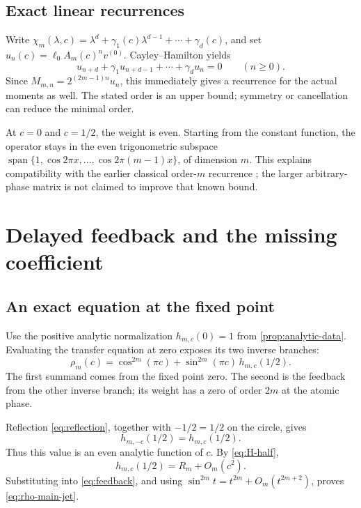 \documentclass[11pt,a4paper]{article}
\numberwithin{equation}{section}
\theoremstyle{definition}
\theoremstyle{remark}
\begin{document}
\subsection{Exact linear recurrences}
Write
$\chi_m(\lambda,c)=\lambda^d+\gamma_1(c)\lambda^{d-1}
+\cdots+\gamma_d(c)$, and set
$u_n(c)=\ell_0A_m(c)^nv^{(0)}$.
Cayley--Hamilton yields
\begin{equation}
 u_{n+d}+\gamma_1u_{n+d-1}+\cdots+\gamma_du_n=0
 \qquad(n\geq0).
 \label{eq:recurrence}
\end{equation}
Since $M_{m,n}=2^{(2m-1)n}u_n$, this immediately gives a recurrence
for the actual moments as well. The stated order is an upper bound;
symmetry or cancellation can reduce the minimal order.

At $c=0$ and $c=1/2$, the weight is even. Starting from the constant
function, the operator stays in the even trigonometric subspace
$\operatorname{span}\{1,\cos2\pi x,\ldots,\cos2\pi(m-1)x\}$,
of dimension $m$. This explains compatibility with the earlier
classical order-$m$ recurrence \cite{MMR,MontgomeryTalk}; the larger
arbitrary-phase matrix is not claimed to improve that known bound.

\section{Delayed feedback and the missing coefficient}
\label{sec:jet}

\subsection{An exact equation at the fixed point}
Use the positive analytic normalization $h_{m,c}(0)=1$ from
\cref{prop:analytic-data}. Evaluating the transfer equation at zero
exposes its two inverse branches:
\begin{equation}
 \boxed{\quad
 \rho_m(c)=\cos^{2m}(\pi c)
   +\sin^{2m}(\pi c)\,h_{m,c}(1/2).
 \quad}
 \label{eq:feedback}
\end{equation}
The first summand comes from the fixed point zero. The second is the
feedback from the other inverse branch; its weight has a zero of order
$2m$ at the atomic phase.

Reflection \cref{eq:reflection}, together with $-1/2=1/2$ on the
circle, gives
\[
 h_{m,-c}(1/2)=h_{m,c}(1/2).
\]
Thus this value is an even analytic function of $c$. By
\cref{eq:H-half},
\begin{equation}
 h_{m,c}(1/2)=R_m+O_m(c^2).
 \label{eq:feedback-value}
\end{equation}
Substituting into \cref{eq:feedback}, and using
$\sin^{2m}t=t^{2m}+O_m(t^{2m+2})$, proves
\cref{eq:rho-main-jet}.
\end{document}
